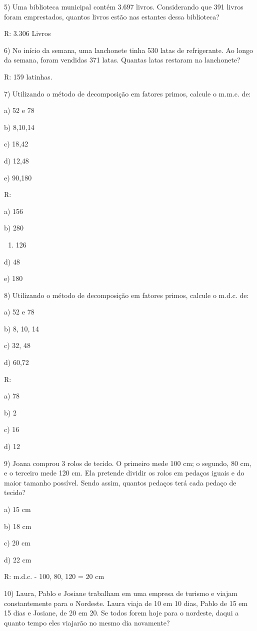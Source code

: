 5) Uma biblioteca municipal contém 3.697 livros. Considerando que 391
livros foram emprestados, quantos livros estão nas estantes dessa
biblioteca?

R: 3.306 Livros

6) No início da semana, uma lanchonete tinha 530 latas de refrigerante.
Ao longo da semana, foram vendidas 371 latas. Quantas latas restaram na
lanchonete?

R: 159 latinhas.

7) Utilizando o método de decomposição em fatores primos, calcule o
m.m.c. de:

a) 52 e 78

b) 8,10,14

c) 18,42

d) 12,48

e) 90,180

R:

a) 156

b) 280

\begin{enumerate}
\def\labelenumi{\alph{enumi})}
\setcounter{enumi}{2}
\tightlist
\item
  126
\end{enumerate}

d) 48

e) 180

8) Utilizando o método de decomposição em fatores primos, calcule o
m.d.c. de:

a) 52 e 78

b) 8, 10, 14

c) 32, 48

d) 60,72

R:

a) 78

b) 2

c) 16

d) 12

9) Joana comprou 3 rolos de tecido. O primeiro mede 100 cm; o segundo,
80 cm, e o terceiro mede 120 cm. Ela pretende dividir os rolos em
pedaços iguais e do maior tamanho possível. Sendo assim, quantos pedaços
terá cada pedaço de tecido?

a) 15 cm

b) 18 cm

c) 20 cm

d) 22 cm

R: m.d.c. - 100, 80, 120 = 20 cm

10) Laura, Pablo e Josiane trabalham em uma empresa de turismo e viajam
constantemente para o Nordeste. Laura viaja de 10 em 10 dias, Pablo de
15 em 15 dias e Josiane, de 20 em 20. Se todos forem hoje para o
nordeste, daqui a quanto tempo eles viajarão no mesmo dia novamente?

